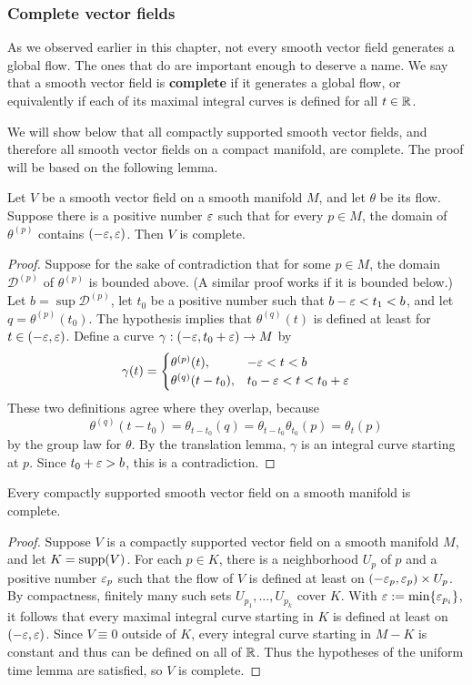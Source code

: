 \subsubsection{Complete vector fields}
As we observed earlier in this chapter, not every smooth vector field generates a global flow. The ones that do are important enough to deserve a name. We say that a smooth vector field is \textbf{complete} if it generates a global flow, or equivalently if each of its maximal integral curves is defined for all $t\in\mathbb{R}$.\par
We will show below that all compactly supported smooth vector fields, and therefore all smooth vector fields on a compact manifold, are complete. The proof will be based on the following lemma.
\begin{lemma}
Let $V$ be a smooth vector field on a smooth manifold $M$, and let $\theta$ be its flow. Suppose there is a positive number $\varepsilon$ such that for every $p\in M$, the domain of $\theta^{(p)}$ contains $(-\varepsilon,\varepsilon)$. Then $V$ is complete.
\end{lemma}
\begin{proof}
Suppose for the sake of contradiction that for some $p\in M$, the domain $\mathcal{D}^{(p)}$ of $\theta^{(p)}$ is bounded above. (A similar proof works if it is bounded below.) Let $b=\sup\mathcal{D}^{(p)}$, let $t_0$ be a positive number such that $b-\varepsilon<t_1<b$, and let $q=\theta^{(p)}(t_0)$. The hypothesis implies that $\theta^{(q)}(t)$ is defined at least for $t\in(-\varepsilon,\varepsilon)$. Define a curve $\gamma:(-\varepsilon,t_0+\varepsilon)\to M$ by
\[\gamma(t)=\begin{cases}
\theta^{(p)}(t),&-\varepsilon<t<b\\
\theta^{(q)}(t-t_0),&t_0-\varepsilon<t<t_0+\varepsilon
\end{cases}\]
These two definitions agree where they overlap, because
\[\theta^{(q)}(t-t_0)=\theta_{t-t_0}(q)=\theta_{t-t_0}\theta_{t_0}(p)=\theta_t(p)\]
by the group law for $\theta$. By the translation lemma, $\gamma$ is an integral curve starting at $p$. Since $t_0+\varepsilon>b$, this is a contradiction.
\end{proof}
\begin{theorem}\label{vector field compact supp complete}
Every compactly supported smooth vector field on a smooth manifold is complete.
\end{theorem}
\begin{proof}
Suppose $V$ is a compactly supported vector field on a smooth manifold $M$, and let $K=\mathrm{supp}(V)$. For each $p\in K$, there is a neighborhood $U_p$ of $p$ and a positive number $\varepsilon_p$ such that the flow of $V$ is defined at least on $(-\varepsilon_p,\varepsilon_p)\times U_p$. By compactness, finitely many such sets $U_{p_1},\dots,U_{p_k}$ cover $K$. With $\varepsilon:=\min\{\varepsilon_{p_i}\}$, it follows that every maximal integral curve starting in $K$ is defined at least on $(-\varepsilon,\varepsilon)$. Since $V\equiv 0$ outside of $K$, every integral curve starting in $M-K$ is constant and thus can be defined on all of $\mathbb{R}$. Thus the hypotheses of the uniform time lemma are satisfied, so $V$ is complete.
\end{proof}
